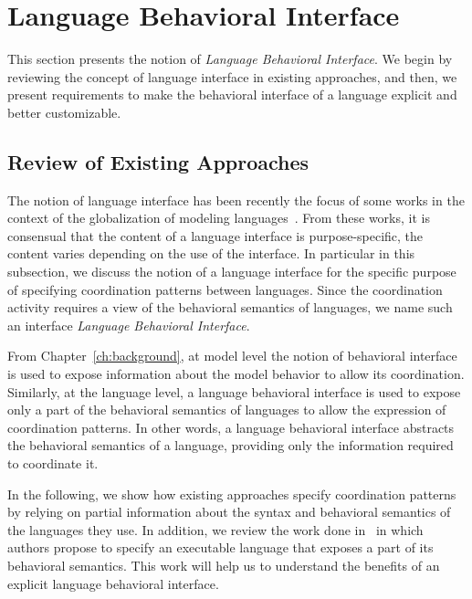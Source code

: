 \section{Language Behavioral Interface}
This section presents the notion of \emph{Language Behavioral Interface}. We begin by reviewing the concept of language interface in existing approaches, and then, we present requirements to make the behavioral interface of a language explicit and better customizable.    

\subsection{Review of Existing Approaches}

The notion of language interface has been recently the focus of some works in the context of the globalization of modeling languages~\cite{GML_ch1,GML_ch3,GML_ch4,degueule2015melange}. From these works, it is consensual that the content of a language interface is purpose-specific, \ie the content varies depending on the use of the interface. In particular in this subsection, we discuss the notion of a language interface for the specific purpose of specifying coordination patterns between languages. Since the coordination activity requires a view of the behavioral semantics of languages, we name such an interface \emph{Language Behavioral Interface}.
	
From Chapter~\ref{ch:background}, at model level the notion of behavioral interface is used to expose information about the model behavior to allow its coordination. Similarly, at the language level, a language behavioral interface is used to expose only a part of the behavioral semantics of languages to allow the expression of coordination patterns. In other words, a language behavioral interface abstracts the behavioral semantics of a language, providing only the information required to coordinate it. 
 
In the following, we show how existing approaches specify coordination patterns by relying on partial information about the syntax and behavioral semantics of the languages they use. In addition, we review the work done in~\cite{sle13-combemale} in which authors propose to specify an executable language that exposes a part of its behavioral semantics. This work will help us to understand the benefits of an explicit language behavioral interface.    

